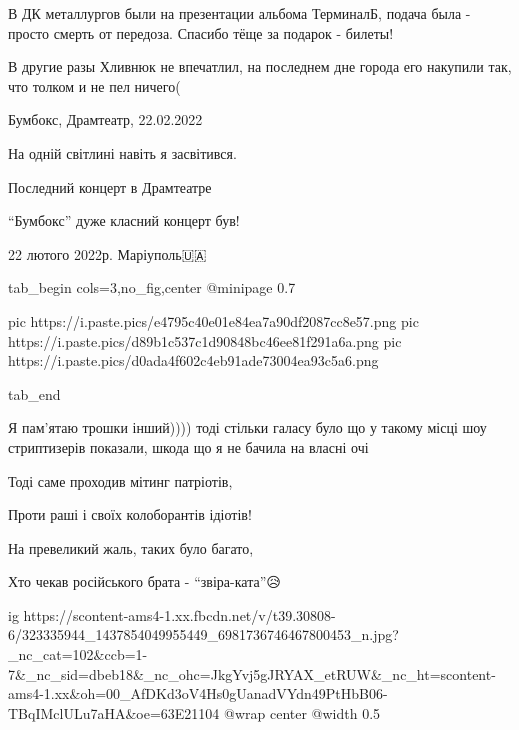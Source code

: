  
 
 
 
 

\qqSecCmt


В ДК металлургов были на презентации альбома ТерминалБ, подача была - просто
смерть от передоза. Спасибо тёще за подарок - билеты!

В другие разы Хливнюк не впечатлил, на последнем дне города его накупили так,
что толком и не пел ничего(


Бумбокс, Драмтеатр, 22.02.2022


На одній світлині навіть я засвітився.


Последний концерт в Драмтеатре


\enquote{Бумбокс} дуже класний концерт був!



22 лютого 2022р. Маріуполь🇺🇦


\ifcmt
  tab_begin cols=3,no_fig,center
		 @minipage 0.7

     pic https://i.paste.pics/e4795c40e01e84ea7a90df2087cc8e57.png
		 pic https://i.paste.pics/d89b1c537c1d90848bc46ee81f291a6a.png
		 pic https://i.paste.pics/d0ada4f602c4eb91ade73004ea93c5a6.png

  tab_end
\fi


Я пам'ятаю трошки інший)))) тоді стільки галасу було що у такому місці шоу
стриптизерів показали, шкода що я не бачила на власні очі😬🫣😂


Тоді саме проходив мітинг патріотів,

Проти раші і своїх колоборантів ідіотів!

На превеликий жаль, таких було багато,

Хто чекав російського брата - \enquote{звіра-ката}😥

\ifcmt
  ig https://scontent-ams4-1.xx.fbcdn.net/v/t39.30808-6/323335944_1437854049955449_6981736746467800453_n.jpg?_nc_cat=102&ccb=1-7&_nc_sid=dbeb18&_nc_ohc=JkgYvj5gJRYAX_etRUW&_nc_ht=scontent-ams4-1.xx&oh=00_AfDKd3oV4Hs0gUanadVYdn49PtHbB06-TBqIMclULu7aHA&oe=63E21104
  @wrap center
  @width 0.5
\fi

